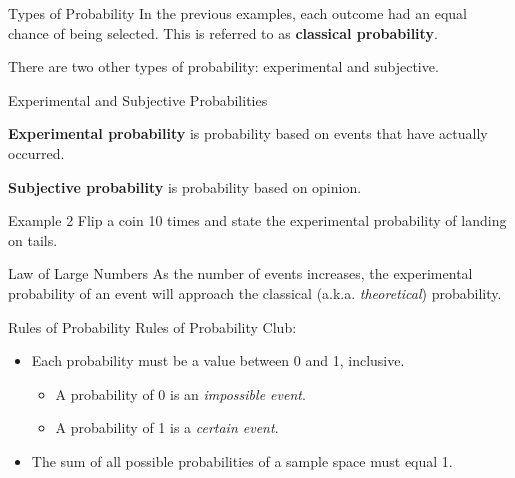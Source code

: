 \documentclass[t]{beamer}
\begin{document}
\begin{frame}{Types of Probability}
In the previous examples, each outcome had an equal chance of being selected. This is referred to as {\color{red}\textbf{classical probability}}.	\newline\\	\pause

There are two other types of probability: experimental and subjective.
\end{frame}

\begin{frame}{Experimental and Subjective Probabilities}
\begin{tcolorbox}[colframe=green!20!black, colback = green!30!white,title=\textbf{Experimental Probability}]
\textbf{Experimental probability} is probability based on events that have actually occurred.
\end{tcolorbox}
\vspace{10pt}	\pause
\begin{tcolorbox}[colframe=green!20!black, colback = green!30!white,title=\textbf{Subjective Probability}]
\textbf{Subjective probability} is probability based on opinion.
\end{tcolorbox}
\end{frame}

\begin{frame}{Example 2}
Flip a coin 10 times and state the experimental probability of landing on tails.
\end{frame}

\begin{frame}{Law of Large Numbers}
As the number of events increases, the experimental probability of an event will approach the classical (a.k.a. \textit{theoretical}) probability.
\end{frame}

\begin{frame}{Rules of Probability}
Rules of Probability Club:	\newline\\ \pause
\begin{itemize}
	\item<+-> Each probability must be a value between 0 and 1, inclusive.
	\begin{itemize}
		\item<+-> A probability of 0 is an \textit{impossible event}.
		\item<+-> A probability of 1 is a \textit{certain event}.
	\end{itemize}
	\item<+-> The sum of all possible probabilities of a sample space must equal 1.
\end{itemize}
\end{frame}
\end{document}
